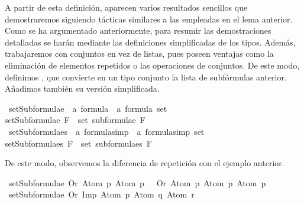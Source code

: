 \begin{isabellebody}
\begin{isamarkuptext}%
A partir de esta definición, aparecen varios resultados sencillos 
que demostraremos siguiendo tácticas similares a las empleadas en el 
lema anterior. Como se ha argumentado anteriormente,
para resumir las demostraciones detalladas se harán mediante las definiciones simplificadas de los tipos.
Además, trabajaremos
con conjuntos en vez de listas, pues poseen ventajas como la eliminación de elementos repetidos
o las operaciones de conjuntos.
De este modo, definimos , que convierte en un tipo conjunto la lista de 
subfórmulas anterior. Añadimos también su versión simplificada.%
\end{isamarkuptext}\isamarkuptrue%
\isamarkupfalse%
\ setSubformulae\ {\isacharcolon}{\isacharcolon}\ {\isachardoublequoteopen}{\isacharprime}a\ formula\ {\isasymRightarrow}\ {\isacharprime}a\ formula\ set{\isachardoublequoteclose}\ \isanewline
{\isachardoublequoteopen}setSubformulae\ F\ {\isasymequiv}\ set\ {\isacharparenleft}subformulae\ F{\isacharparenright}{\isachardoublequoteclose}\isanewline
\isanewline
{}\isamarkupfalse%
\ setSubformulae{\isacharunderscore}s\ {\isacharcolon}{\isacharcolon}\ {\isachardoublequoteopen}{\isacharprime}a\ formula{\isacharunderscore}simp\ {\isasymRightarrow}\ {\isacharprime}a\ formula{\isacharunderscore}simp\ set{\isachardoublequoteclose}\ \isanewline
{\isachardoublequoteopen}setSubformulae{\isacharunderscore}s\ F\ {\isasymequiv}\ set\ {\isacharparenleft}subformulae{\isacharunderscore}s\ F{\isacharparenright}{\isachardoublequoteclose}%
\begin{isamarkuptext}%
De este modo, observemos la diferencia de repetición con el ejemplo anterior.%
\end{isamarkuptext}\isamarkuptrue%
\isamarkupfalse%
\ {\isachardoublequoteopen}setSubformulae\ {\isacharparenleft}Or\ {\isacharparenleft}Atom\ p{\isacharparenright}\ {\isacharparenleft}Atom\ p{\isacharparenright}{\isacharparenright}\ {\isacharequal}\ \ {\isacharbraceleft}Or\ {\isacharparenleft}Atom\ p{\isacharparenright}\ {\isacharparenleft}Atom\ p{\isacharparenright}{\isacharcomma}\ Atom\ p{\isacharbraceright}{\isachardoublequoteclose}\isanewline
\isanewline
{}\isamarkupfalse%
\ {\isachardoublequoteopen}setSubformulae\ {\isacharparenleft}Or\ {\isacharparenleft}Imp\ {\isacharparenleft}Atom\ p{\isacharparenright}\ {\isacharparenleft}Atom\ q{\isacharparenright}{\isacharparenright}\ {\isacharparenleft}Atom\ r{\isacharparenright}{\isacharparenright}\ {\isacharequal}\ \isanewline

\end{isabellebody}
